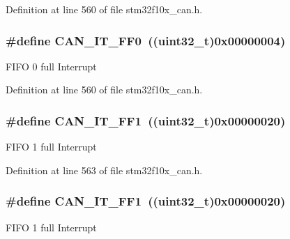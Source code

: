 Definition at line 560 of file stm32f10x\+\_\+can.\+h.

\subsubsection[{\texorpdfstring{C\+A\+N\+\_\+\+I\+T\+\_\+\+F\+F0}{CAN_IT_FF0}}]{\setlength{\rightskip}{0pt plus 5cm}\#define C\+A\+N\+\_\+\+I\+T\+\_\+\+F\+F0~(({\bf uint32\+\_\+t})0x00000004)}\hypertarget{group___c_a_n__interrupts_gabf63043d9216de80ddc7ffe57b23ef67}{}\label{group___c_a_n__interrupts_gabf63043d9216de80ddc7ffe57b23ef67}
F\+I\+FO 0 full Interrupt 

Definition at line 560 of file stm32f10x\+\_\+can.\+h.

\subsubsection[{\texorpdfstring{C\+A\+N\+\_\+\+I\+T\+\_\+\+F\+F1}{CAN_IT_FF1}}]{\setlength{\rightskip}{0pt plus 5cm}\#define C\+A\+N\+\_\+\+I\+T\+\_\+\+F\+F1~(({\bf uint32\+\_\+t})0x00000020)}\hypertarget{group___c_a_n__interrupts_ga93b86d884ce0624b4b36c991fd75fc1c}{}\label{group___c_a_n__interrupts_ga93b86d884ce0624b4b36c991fd75fc1c}
F\+I\+FO 1 full Interrupt 

Definition at line 563 of file stm32f10x\+\_\+can.\+h.

\subsubsection[{\texorpdfstring{C\+A\+N\+\_\+\+I\+T\+\_\+\+F\+F1}{CAN_IT_FF1}}]{\setlength{\rightskip}{0pt plus 5cm}\#define C\+A\+N\+\_\+\+I\+T\+\_\+\+F\+F1~(({\bf uint32\+\_\+t})0x00000020)}\hypertarget{group___c_a_n__interrupts_ga93b86d884ce0624b4b36c991fd75fc1c}{}\label{group___c_a_n__interrupts_ga93b86d884ce0624b4b36c991fd75fc1c}
F\+I\+FO 1 full Interrupt 

